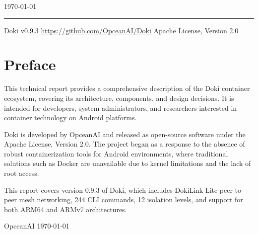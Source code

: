 \begin{titlepage}
  \vspace{0.4cm}

  {\sffamily\fontsize{10}{13}\selectfont\color{textgray} \today\par}

  \vfill

  {\color{accentClay}\rule{\textwidth}{0.4pt}}

  \vspace{0.4cm}

  {\sffamily\fontsize{8}{10}\selectfont\color{textgray}
    Doki v0.9.3 \textbar{}
    \url{https://github.com/OpceanAI/Doki} \textbar{}
    Apache License, Version 2.0
  \par}

  \vspace{0.8cm}
\end{titlepage}

\chapter*{Preface}

This technical report provides a comprehensive description of the Doki
container ecosystem, covering its architecture, components, and design
decisions. It is intended for developers, system administrators, and
researchers interested in container technology on Android platforms.

Doki is developed by OpceanAI and released as open-source software
under the Apache License, Version 2.0. The project began as a response
to the absence of robust containerization tools for Android
environments, where traditional solutions such as Docker are
unavailable due to kernel limitations and the lack of root access.

This report covers version 0.9.3 of Doki, which includes DokiLink-Lite
peer-to-peer mesh networking, 244 CLI commands, 12 isolation levels,
and support for both ARM64 and ARMv7 architectures.

\begin{center}
  \color{textgray}
  \sffamily\small
  OpceanAI \textbar{} \today
\end{center}

\cleardoublepage
